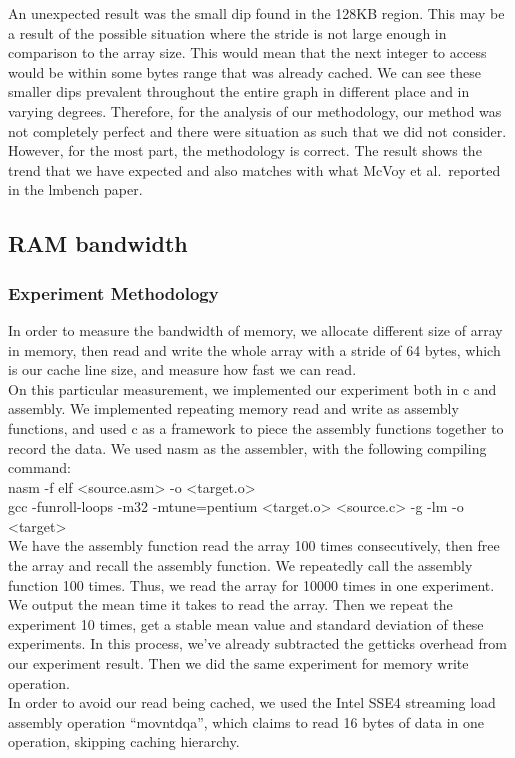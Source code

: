 \documentclass{article} %
\begin{document}
An unexpected result was the small dip found in the 128KB region. This may be
a result of the possible situation where the stride is not large enough in
comparison to the array size. This would mean that the next integer to access
would be within some bytes range that was already cached. We can see these
smaller dips prevalent throughout the entire graph in different place and in
varying degrees. Therefore, for the analysis of our methodology, our method
was not completely perfect and there were situation as such that we did not
consider. However, for the most part, the methodology is correct. The result
shows the trend that we have expected and also matches with what McVoy et al.\
reported in the lmbench paper.


\subsection{RAM bandwidth}
\subsubsection{Experiment Methodology}
In order to measure the bandwidth of memory, we allocate different size of array in memory, then read and write the whole array with a stride of 64 bytes, which is our cache line size, and measure how fast we can read. \\
On this particular measurement, we implemented our experiment both in c and assembly. We implemented repeating memory read and write as assembly functions, and used c as a framework to piece the assembly functions together to record the data. We used nasm as the assembler, with the following compiling command:\\

nasm -f elf <source.asm> -o <target.o> \\
gcc -funroll-loops -m32 -mtune=pentium <target.o> <source.c> -g -lm -o <target>\\

We have the assembly function read the array 100 times consecutively, then free the array and recall the assembly function. We repeatedly call the assembly function 100 times. Thus, we read the array for 10000 times in one experiment. We output the mean time it takes to read the array. Then we repeat the experiment 10 times, get a stable mean value and standard deviation of these experiments. In this process, we've already subtracted the getticks overhead from our experiment result. Then we did the same experiment for memory write operation.\\
In order to avoid our read being cached, we used the Intel SSE4 streaming load assembly operation ``movntdqa'', which claims to read 16 bytes of data in one operation, skipping caching hierarchy.\\
\end{document}
